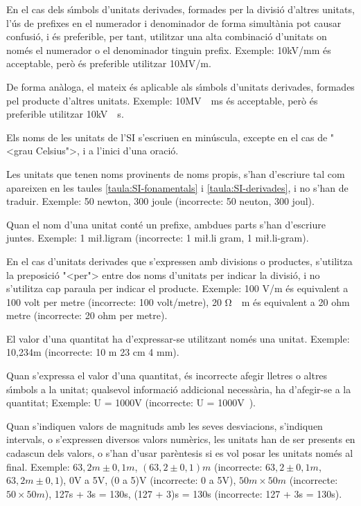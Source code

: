 En el cas dels s\'{\i}mbols d'unitats derivades, formades per la divisi\'{o}
d'altres unitats, l'\'{u}s de prefixes en el numerador i denominador de
forma simult\`{a}nia pot causar confusi\'{o}, i \'{e}s preferible, per tant,
utilitzar una alta combinaci\'{o} d'unitats on nom\'{e}s el numerador o el
denominador tinguin prefix. Exemple: 10\unit{kV/mm} \'{e}s acceptable,
per\`{o} \'{e}s preferible utilitzar 10\unit{MV/m}.

De forma an\`{a}loga, el mateix \'{e}s aplicable als s\'{\i}mbols d'unitats
derivades, formades pel producte d'altres unitats.  Exemple:
10\unit{MV\cdot ms} \'{e}s acceptable, per\`{o} \'{e}s preferible utilitzar
10\unit{kV\cdot s}.

Els noms de les unitats de l'SI s'escriuen en min\'{u}scula, excepte en
el cas de {"<}grau Celsius{">}, i a l'inici d'una oraci\'{o}.

Les unitats que tenen noms provinents de noms propis, s'han
d'escriure tal com apareixen en les taules
\vref{taula:SI-fonamentals} i \vref{taula:SI-derivades}, i no s'han
de traduir. Exemple: 50 newton, 300 joule (incorrecte: 50 neuton,
300 joul).


 Quan el nom d'una unitat
cont\'{e} un prefixe, ambdues parts s'han d'escriure juntes. Exemple: 1
mi{\l.l}igram (incorrecte: 1 mi{\l.l}i gram, 1 mi{\l.l}i-gram).

En el cas  d'unitats derivades que s'expressen amb divisions o
productes, s'utilitza la preposici\'{o} {"<}per{">} entre dos noms d'unitats
per indicar la divisi\'{o}, i no s'utilitza cap paraula per indicar el
producte. Exemple: 100 \unit{V/m} \'{e}s equivalent a 100 volt per metre
(incorrecte:
 100 volt/metre), 20 \unit{\ohm\cdot m} \'{e}s equivalent a 20 ohm metre
(incorrecte: 20 ohm per metre).

El valor d'una quantitat ha d'expressar-se  utilitzant nom\'{e}s una
unitat. Exemple: 10,234\unit{m} (incorrecte: 10 m 23 cm 4 mm).

Quan s'expressa el valor d'una quantitat, \'{e}s incorrecte afegir
lletres o altres s\'{\i}mbols a la unitat; qualsevol informaci\'{o}
addicional necess\`{a}ria, ha d'afegir-se a la quantitat; Exemple:
U = 1000\unit{V} (incorrecte: U = 1000\unit{V}).

Quan s'indiquen valors de magnituds amb les seves desviacions,
s'indiquen intervals, o s'expressen diversos valors num\`{e}rics, les
unitats han de ser presents en cadascun dels valors, o s'han d'usar
par\`{e}ntesis si es vol posar les unitats nom\'{e}s al final. Exemple:
$63{,}2\unit{m} \pm 0{,}1\unit{m}$, $(63{,}2 \pm 0{,}1)\unit{m}$
(incorrecte: $63{,}2 \pm 0{,}1\unit{m}$, $63{,}2\unit{m} \pm
0{,}1$), 0\unit{V} a 5\unit{V}, (0 a 5)\unit{V} (incorrecte: 0 a
5\unit{V}), $50\unit{m}\times 50\unit{m}$ (incorrecte: $50\times
50\unit{m}$), 127\unit{s} + 3\unit{s} = 130\unit{s}, (127 +
3)\unit{s} = 130\unit{s} (incorrecte: 127 + 3\unit{s} =
130\unit{s}).

